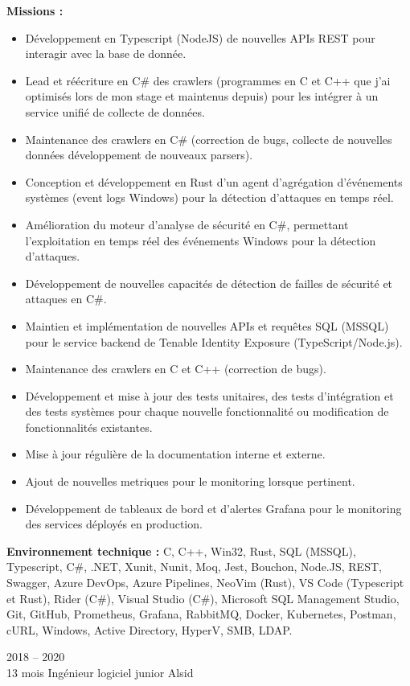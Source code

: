 \documentclass[8pt]{developercv} %
\begin{document}
\textbf{Missions :}
\begin{itemize}
    \item Développement en Typescript (NodeJS) de nouvelles APIs REST pour interagir avec la base de donnée.
    \item Lead et réécriture en C\# des crawlers (programmes en C et C++ que j'ai optimisés lors de mon stage et maintenus depuis) pour les intégrer à un service unifié de collecte de données.
    \item Maintenance des crawlers en C\# (correction de bugs, collecte de nouvelles données développement de nouveaux parsers).
    \item Conception et développement en Rust d'un agent d'agrégation d'événements systèmes (event logs Windows) pour la détection d'attaques en temps réel.
    \item Amélioration du moteur d'analyse de sécurité en C\#, permettant l'exploitation en temps réel des événements Windows pour la détection d'attaques.
    \item Développement de nouvelles capacités de détection de failles de sécurité et attaques en C\#.
    \item Maintien et implémentation de nouvelles APIs et requêtes SQL (MSSQL) pour le service backend de Tenable Identity Exposure (TypeScript/Node.js).
    \item Maintenance des crawlers en C et C++ (correction de bugs).
    \item Développement et mise à jour des tests unitaires, des tests d'intégration et des tests systèmes pour chaque nouvelle fonctionnalité ou modification de fonctionnalités existantes.
    \item Mise à jour régulière de la documentation interne et externe.
    \item Ajout de nouvelles metriques pour le monitoring lorsque pertinent.
    \item Développement de tableaux de bord et d'alertes Grafana pour le monitoring des services déployés en production.
\end{itemize}
\vspace{\baselineskip}
\textbf{Environnement technique :} C, C++, Win32, Rust, SQL (MSSQL), Typescript, C\#, .NET, Xunit, Nunit, Moq, Jest, Bouchon, Node.JS, REST, Swagger, Azure DevOps, Azure Pipelines, NeoVim (Rust), VS Code (Typescript et Rust), Rider (C\#), Visual Studio (C\#), Microsoft SQL Management Studio, Git, GitHub, Prometheus, Grafana, RabbitMQ, Docker, Kubernetes, Postman, cURL, Windows, Active Directory, HyperV, SMB, LDAP.\\
\vspace{\baselineskip}
\begin{entrylisthrules}
    \entry
    {2018 -- 2020\\\footnotesize{13 mois}}
    {Ingénieur logiciel junior}
    {Alsid}
    {}
\end{entrylisthrules}
\end{document}
